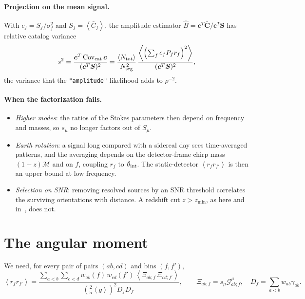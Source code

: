 \documentclass[11pt]{article}
\newcommand{\avg}[1]{\left\langle #1 \right\rangle}
\newcommand{\cG}{\mathcal{G}}
\theoremstyle{remark}
\begin{document}
\paragraph{Projection on the mean signal.}
With $c_f = S_f/\sigma_f^2$ and $S_f = \avg{\bar C_f}$, the amplitude estimator
$\hat B = \bm c^T \bar{\bm C} / \bm c^T \bm S$ has relative catalog variance
\begin{equation}
  s^2 = \frac{\bm c^T\, \mathrm{Cov}_{\rm cat}\, \bm c}{(\bm c^T \bm S)^2}
  = \frac{\avg{N_{\rm tot}}}{N_{\rm seg}^2}\,
    \frac{\avg{\left(\textstyle\sum_f c_f P_f r_f\right)^2}}{(\bm c^T\bm S)^2},
  \label{eq:projected}
\end{equation}
the variance that the \texttt{"amplitude"} likelihood adds to $\rho^{-2}$.

\paragraph{When the factorization fails.}
\begin{itemize}
  \item \emph{Higher modes}: the ratios of the Stokes parameters then depend on
        frequency and masses, so $s_\mu$ no longer factors out of $S_\mu$.
  \item \emph{Earth rotation}: a signal long compared with a sidereal day sees
        time-averaged patterns, and the averaging depends on the
        detector-frame chirp mass $(1+z)\mathcal M$ and on $f$, coupling
        $r_f$ to $\theta_{\rm int}$. The static-detector $\avg{r_f r_{f'}}$ is
        then an upper bound at low frequency.
  \item \emph{Selection on SNR}: removing resolved sources by an SNR threshold
        correlates the surviving orientations with distance. A redshift cut
        $z > z_{\min}$, as here and in~\cite{Zhong2026}, does not.
\end{itemize}

\section{The angular moment}

We need, for every pair of pairs $(ab, cd)$ and bins $(f, f')$,
\begin{equation}
  \avg{r_f r_{f'}}
  = \frac{\sum_{a<b}\sum_{c<d} w_{ab}(f)\, w_{cd}(f')\,
          \avg{\Xi_{ab;f}\,\Xi_{cd;f'}}}
         {\left(\tfrac25\avg{g}\right)^2 D_f D_{f'}},
  \qquad
  \Xi_{ab;f} = s_\mu \cG^\mu_{ab;f}, \quad
  D_f = \sum_{a<b} w_{ab}\gamma_{ab} .
\end{equation}
\end{document}
